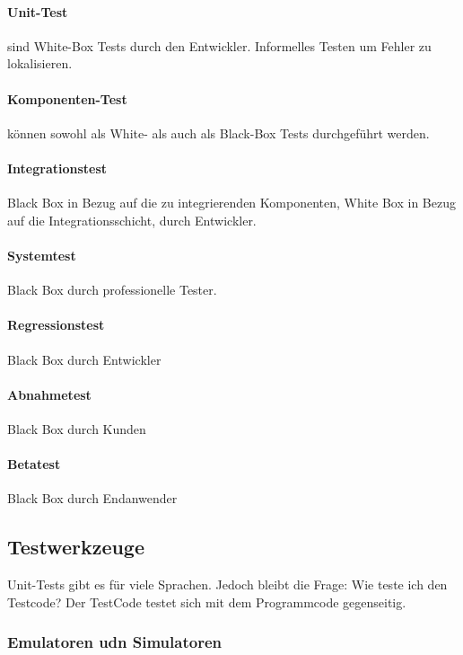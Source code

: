 \paragraph{Unit-Test} sind White-Box Tests durch den Entwickler. Informelles Testen um Fehler zu lokalisieren.

\paragraph{Komponenten-Test} können sowohl als White- als auch als Black-Box Tests durchgeführt werden.

\paragraph{Integrationstest} Black Box in Bezug auf die zu integrierenden Komponenten, White Box in Bezug auf die Integrationsschicht, durch Entwickler.

\paragraph{Systemtest} Black Box durch professionelle Tester.

\paragraph{Regressionstest} Black Box durch Entwickler

\paragraph{Abnahmetest} Black Box durch Kunden

\paragraph{Betatest} Black Box durch Endanwender

\subsection{Testwerkzeuge}
Unit-Tests gibt es für viele Sprachen. Jedoch bleibt die Frage: Wie teste ich den Testcode? Der TestCode testet sich mit dem Programmcode gegenseitig.

\subsubsection{Emulatoren udn Simulatoren}

